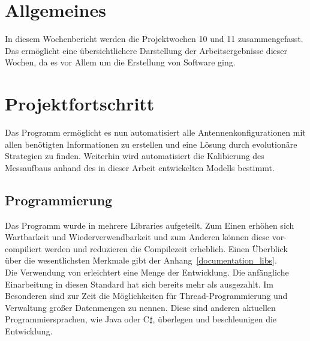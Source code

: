 \documentclass[a4paper,12pt,fleqn]{article}
\begin{document}
\setlength{\headheight}{36pt}

\begin{titlepage}



\end{titlepage}

\section[Allgemeines]{Allgemeines}
%
In diesem Wochenbericht werden die Projektwochen 10 und 11 zusammengefasst. Das ermöglicht eine übersichtlichere Darstellung der Arbeitsergebnisse dieser Wochen, da es vor Allem um die Erstellung von Software ging. 
%
\section[Fortschritt]{Projektfortschritt}
%
Das Programm ermöglicht es nun automatisiert alle Antennenkonfigurationen mit allen benötigten Informationen zu erstellen und eine Lösung durch evolutionäre Strategien zu finden. Weiterhin wird automatisiert die Kalibierung des Messaufbaus anhand des in dieser Arbeit entwickelten Modells bestimmt.

\subsection{Programmierung}
%
Das Programm wurde in mehrere Libraries aufgeteilt. Zum Einen erhöhen sich Wartbarkeit und Wiederverwendbarkeit und zum Anderen können diese vor-compiliert werden und reduzieren die Compilezeit erheblich. Einen Überblick über die wesentlichsten Merkmale gibt der Anhang~\ref{documentation_libs}.\\
Die Verwendung von  erleichtert eine Menge der Entwicklung. Die anfängliche Einarbeitung in diesen Standard hat sich bereits mehr als ausgezahlt. Im Besonderen sind zur Zeit die Möglichkeiten für Thread-Programmierung und Verwaltung großer Datenmengen zu nennen. Diese sind anderen aktuellen Programmiersprachen, wie Java oder C$\sharp$, überlegen und beschleunigen die Entwicklung.
%
\end{document}
